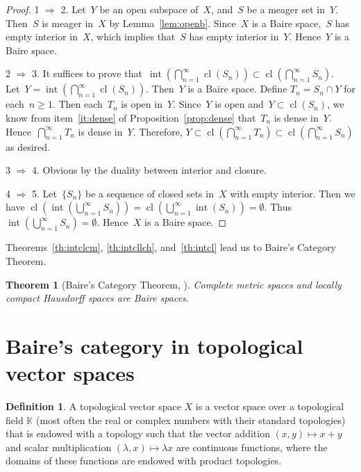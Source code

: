 \documentclass[11pt,a4paper]{article}
\newtheorem{theorem}{Theorem}[section]
\theoremstyle{definition}
\newtheorem{definition}{Definition}[section]
\def\KK{\mathbb{K}}
\DeclareMathOperator{\inter}{int}
\DeclareMathOperator{\cl}{cl}
\numberwithin{equation}{section}
\begin{document}
\begin{proof}
  1 $\Rightarrow$ 2. Let~$Y$ be an open subspace of~$X$, and~$S$ be a meager set in~$Y$.
  Then~$S$ is meager in~$X$ by Lemma~\ref{lem:openb}. Since~$X$ is a Baire space,~$S$ has empty interior in~$X$, which
  implies that~$S$ has empty interior in~$Y$. Hence~$Y$ is a Baire space. 

  2 $\Rightarrow$ 3. It suffices to prove that~$\inter(\bigcap_{n=1}^\infty \cl(S_n))\subset\cl(\bigcap_{n=1}^\infty S_n)$. 
  Let~$Y=\inter(\bigcap_{n=1}^\infty \cl(S_n))$. Then~$Y$ is a Baire space. 
  Define $T_n = S_n\cap Y$ for each~$n\ge 1$. Then each~$T_n$ is open in~$Y$. Since~$Y$ is open
  and~$Y\subset \cl(S_n)$, we know from item~\ref{it:dense} of Proposition~\ref{prop:dense}
  that~$T_n$ is dense in~$Y$. Hence~$\bigcap_{n=1}^\infty T_n$
  is dense in~$Y$. Therefore, $Y \subset \cl(\bigcap_{n=1}^\infty T_n) \subset
  \cl(\bigcap_{n=1}^\infty S_n)$ as desired. 

  3 $\Rightarrow$ 4. Obvious by the duality between interior and closure. 

  4 $\Rightarrow$ 5. Let~$\{S_n\}$ be a sequence of closed sets in~$X$ with empty interior. Then we
    have
  $\cl(\inter(\bigcup_{n=1}^\infty S_n)) = \cl(\bigcup_{n=1}^\infty \inter(S_n)) = \emptyset$.
  Thus~$\inter(\bigcup_{n=1}^\infty S_n) = \emptyset$. Hence~$X$ is a Baire space. 
\end{proof}

Theorems~\ref{th:intclcm}, \ref{th:intcllch}, and~\ref{th:intcl} lead us to Baire's Category
Theorem.

\begin{theorem}[Baire's Category Theorem, {\cite[Theorem~48.2]{Munkres_2000}}]
  \label{th:Baire}
  Complete metric spaces and locally compact Hausdorff spaces are Baire spaces.
\end{theorem}


\section{Baire's category in topological vector spaces}

\begin{definition}
 A topological vector space $X$ is a vector space over a topological field $\KK$ (most often the
 real or complex numbers with their standard topologies) that is endowed with a topology such that
 the vector addition $(x,y)\mapsto x+y$ and scalar multiplication $(\lambda, x) \mapsto \lambda x$ are continuous functions, where the domains of these
 functions are endowed with product topologies.
\end{definition}
\end{document}
